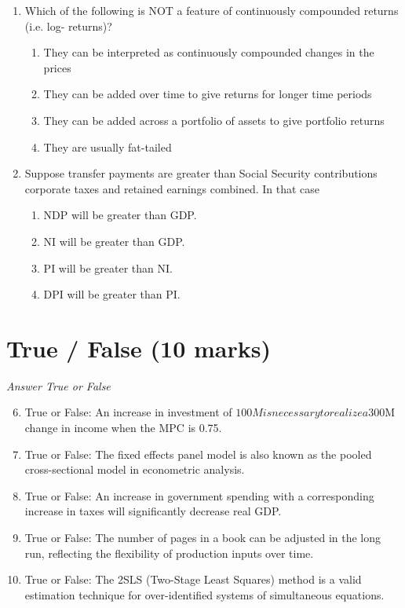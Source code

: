 \documentclass[12pt]{article}
\begin{document}
\begin{enumerate}[label=\arabic*.]
\begin{enumerate}[label=(\alph*)]
\end{enumerate}
\item Which of the following is NOT a feature of continuously compounded returns (i.e. log-
returns)?
\begin{enumerate}[label=(\alph*)]
    \item They can be interpreted as continuously compounded changes in the prices
    \item They can be added over time to give returns for longer time periods
    \item They can be added across a portfolio of assets to give portfolio returns
    \item They are usually fat-tailed
\end{enumerate}
\item Suppose transfer payments are greater than Social Security contributions corporate taxes
and retained earnings combined. In that case
\begin{enumerate}[label=(\alph*)]
    \item NDP will be greater than GDP.
    \item NI will be greater than GDP.
    \item PI will be greater than NI.
    \item DPI will be greater than PI.
\end{enumerate}
\end{enumerate}

\section*{True / False (10 marks)}
\textit{Answer True or False}
\begin{enumerate}[label=\arabic*.]
\setcounter{enumi}{5}
\item True or False: An increase in investment of $100M is necessary to realize a $300M change in income when the MPC is 0.75.
\item True or False: The fixed effects panel model is also known as the pooled cross-sectional model in econometric analysis.
\item True or False: An increase in government spending with a corresponding increase in taxes will significantly decrease real GDP.
\item True or False: The number of pages in a book can be adjusted in the long run, reflecting the flexibility of production inputs over time.
\item True or False: The 2SLS (Two-Stage Least Squares) method is a valid estimation technique for over-identified systems of simultaneous equations.
\end{enumerate}
\end{document}
